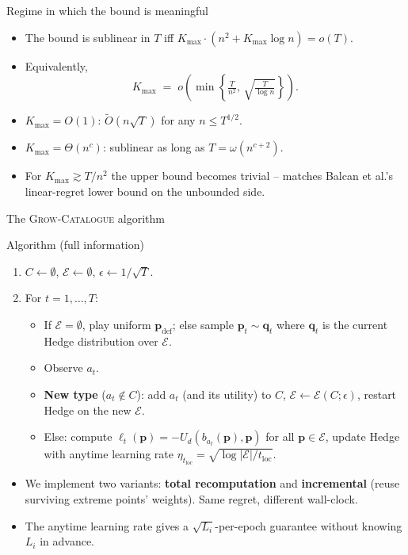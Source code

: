 \documentclass[10pt,aspectratio=169]{beamer}
\newcommand{\impcompterm}[1]{\textbf{\color{darkgreen}{#1}}}
\newcommand{\pvec}{\mathbf{p}}
\newcommand{\qvec}{\mathbf{q}}
\newcommand{\cE}{\mathcal{E}}
\newcommand{\Kmax}{K_{\max}}
\begin{document}
\begin{frame}{Regime in which the bound is meaningful}
\begin{itemize}
\item The bound is sublinear in $T$ iff $\Kmax\cdot(n^2+\Kmax\log n)=o(T)$.
\item Equivalently,
      \[
      \Kmax\;=\;o\!\left(\min\!\left\{\tfrac{T}{n^2},\,\sqrt{\tfrac{T}{\log n}}\right\}\right).
      \]
\item $\Kmax=O(1)$: $\tilde O(n\sqrt T)$ for any $n\le T^{1/2}$.
\item $\Kmax=\Theta(n^c)$: sublinear as long as $T=\omega(n^{c+2})$.
\item For $\Kmax\gtrsim T/n^2$ the upper bound becomes trivial -- matches Balcan et al.'s linear-regret lower bound on the unbounded side.
\end{itemize}
\end{frame}


\begin{frame}{The \textsc{Grow-Catalogue} algorithm}
\small
\begin{block}{Algorithm (full information)}
\begin{enumerate}
\item $C\gets\emptyset$, $\cE\gets\emptyset$, $\epsilon\gets 1/\sqrt T$.
\item For $t=1,\dots,T$:
\begin{itemize}\small
\item If $\cE=\emptyset$, play uniform $\pvec_{\text{def}}$; else sample $\pvec_t\sim\qvec_t$ where $\qvec_t$ is the current Hedge distribution over $\cE$.
\item Observe $a_t$.
\item \textbf{New type} ($a_t\notin C$): add $a_t$ (and its utility) to $C$, \impcompterm{recompute} $\cE\gets\cE(C;\epsilon)$, restart Hedge on the new $\cE$.
\item Else: compute $\ell_t(\pvec)=-U_d(b_{a_t}(\pvec),\pvec)$ for all $\pvec\in\cE$, update Hedge with anytime learning rate $\eta_{t_{\text{loc}}}=\sqrt{\log|\cE|/t_{\text{loc}}}$.
\end{itemize}
\end{enumerate}
\end{block}
\begin{itemize}\small
\item We implement two variants: \textbf{total recomputation} and \textbf{incremental} (reuse surviving extreme points' weights). Same regret, different wall-clock.
\item The anytime learning rate gives a $\sqrt{L_i}$-per-epoch guarantee without knowing $L_i$ in advance.
\end{itemize}
\end{frame}
\end{document}
